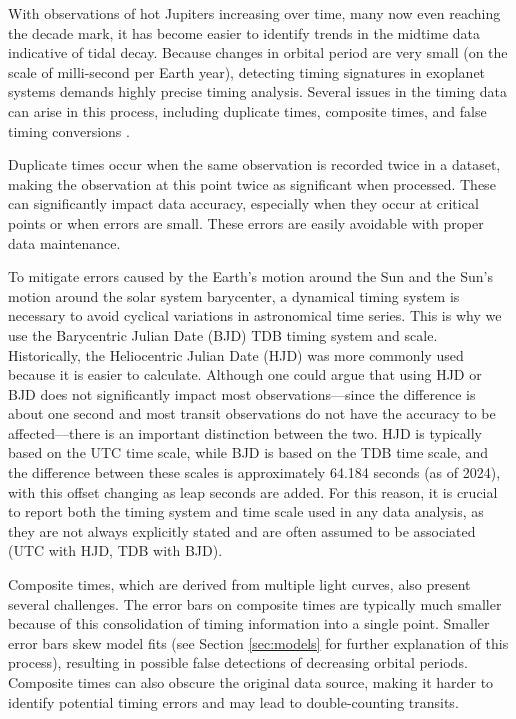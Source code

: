 \documentclass[oneside,12pt]{amsart}
\numberwithin{page}{section}
\begin{document}
With observations of hot Jupiters increasing over time, many now even reaching the decade mark, it has become easier to identify trends in the midtime data indicative of tidal decay. Because changes in orbital period are very small (on the scale of milli-second per Earth year), detecting timing signatures in exoplanet systems demands highly precise timing analysis. Several issues in the timing data can arise in this process, including duplicate times, composite times, and false timing conversions \citep{adams2024doomed}. 

Duplicate times occur when the same observation is recorded twice in a dataset, making the observation at this point twice as significant when processed. These can significantly impact data accuracy, especially when they occur at critical points or when errors are small. These errors are easily avoidable with proper data maintenance. 

To mitigate errors caused by the Earth's motion around the Sun and the Sun's motion around the solar system barycenter, a dynamical timing system is necessary to avoid cyclical variations in astronomical time series. This is why we use the Barycentric Julian Date (BJD) TDB timing system and scale. Historically, the Heliocentric Julian Date (HJD) was more commonly used because it is easier to calculate. Although one could argue that using HJD or BJD does not significantly impact most observations—since the difference is about one second and most transit observations do not have the accuracy to be affected—there is an important distinction between the two. HJD is typically based on the UTC time scale, while BJD is based on the TDB time scale, and the difference between these scales is approximately 64.184 seconds (as of 2024), with this offset changing as leap seconds are added. For this reason, it is crucial to report both the timing system and time scale used in any data analysis, as they are not always explicitly stated and are often assumed to be associated (UTC with HJD, TDB with BJD).

Composite times, which are derived from multiple light curves, also present several challenges. The error bars on composite times are typically much smaller because of this consolidation of timing information into a single point. Smaller error bars skew model fits (see Section \ref{sec:models} for further explanation of this process), resulting in possible false detections of decreasing orbital periods. Composite times can also obscure the original data source, making it harder to identify potential timing errors and may lead to double-counting transits.
\end{document}
